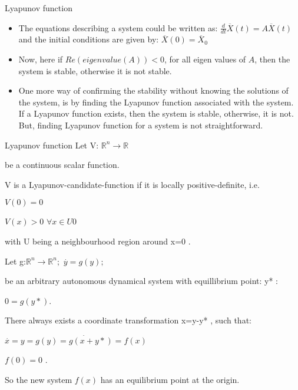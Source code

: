 \documentclass{beamer}
\begin{document}
\begin{frame}{Lyapunov function}
\begin{itemize}
\item {The equations describing a system could be written as: $\frac{d}{dt}\overline{X}\left(t\right)=A\overline{X}\left(t\right)$
and the initial conditions are given by: $\overline{X}\left(0\right)=\overline{X}_{0}$}
\item {Now, here if $Re\left(eigenvalue\left(A\right)\right)<0$,  for all eigen values of $A$, then the system is stable, otherwise it is not stable.}
\item {One more way of confirming the stability without knowing the solutions of the system, is by finding the Lyapunov function associated with the system. If a Lyapunov function exists, then the system is stable, otherwise, it is not. But, finding Lyapunov function for a system is not straightforward.}
\end{itemize}

\end{frame}
\begin{frame}{Lyapunov function}
Let V: $\mathbb{R}^{n}\rightarrow\mathbb{R}$
 

be a continuous scalar function.

V
  is a Lyapunov-candidate-function if it is locally positive-definite, i.e.

$V\left(0\right)=0$
 

$V\left(x\right)>0$
  $\forall x\in U{0}$
 

with U
  being a neighbourhood region around x=0
 .

Let g:$\mathbb{R}^{n}\rightarrow\mathbb{R}^{n}
 ;$ $\overset{.}{y}=g\left(y\right);$
 

be an arbitrary autonomous dynamical system with equillibrium point: y*
 :

$0=g\left(y*\right)$.
 

There always exists a coordinate transformation x=y-y*
 , such that:

$\overset{.}{x}=\overset{.}{y=g\left(y\right)=g\left(x+y*\right)=f\left(x\right)}$
 

$f\left(0\right)=0$
 .

So the new system $f\left(x\right)$
 has an equilibrium point at the origin.
\end{frame}
\end{document}
